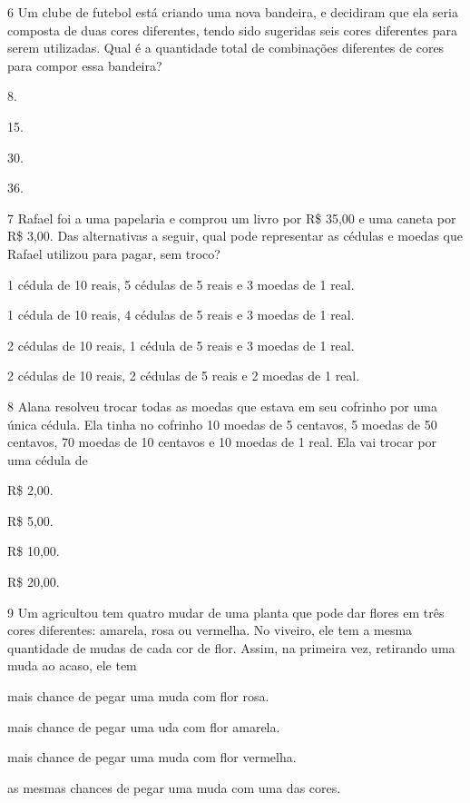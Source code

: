 \num{6} Um clube de futebol está criando uma nova bandeira, e decidiram que ela seria composta de duas cores diferentes, tendo sido sugeridas seis cores
diferentes para serem utilizadas. Qual é a quantidade total de combinações
diferentes de cores para compor essa bandeira?

\begin{escolha}
\item
  8.
\item
  15.
\item
  30.
\item
  36.
\end{escolha}


\num{7} Rafael foi a uma papelaria e comprou um livro por R\$ 35,00 e uma caneta
por R\$ 3,00. Das alternativas a seguir, qual pode representar as cédulas
e moedas que Rafael utilizou para pagar, sem troco?

\begin{escolha}
\item
  1 cédula de 10 reais, 5 cédulas de 5 reais e 3 moedas de 1 real.
\item
  1 cédula de 10 reais, 4 cédulas de 5 reais e 3 moedas de 1 real.
\item
  2 cédulas de 10 reais, 1 cédula de 5 reais e 3 moedas de 1 real.
\item
  2 cédulas de 10 reais, 2 cédulas de 5 reais e 2 moedas de 1 real.
\end{escolha}


\num{8} Alana resolveu trocar todas as moedas que estava em seu cofrinho por uma
única cédula. Ela tinha no cofrinho 10 moedas de 5 centavos, 5 moedas de
50 centavos, 70 moedas de 10 centavos e 10 moedas de 1 real. Ela vai trocar por uma cédula de

\begin{escolha}
\item R\$ 2,00.
\item R\$ 5,00.
\item R\$ 10,00.
\item R\$ 20,00.
\end{escolha}


\num{9} Um agricultou tem quatro mudar de uma planta que pode dar flores em três cores diferentes: amarela, rosa ou vermelha. No viveiro, ele tem a mesma quantidade de mudas de cada cor de flor. Assim, na primeira vez, retirando uma muda ao acaso, ele tem

\begin{escolha}
\item mais chance de pegar uma muda com flor rosa.
\item mais chance de pegar uma uda com flor amarela.
\item mais chance de pegar uma muda com flor vermelha.
\item as mesmas chances de pegar uma muda com uma das cores.
\end{escolha}


